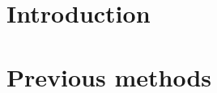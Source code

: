 \documentclass[titlepage, a4paper,12pt,draft]{article}
\begin{document}






\tableofcontents
\newpage

\section{Introduction}


\section{Previous methods}

\end{document}
